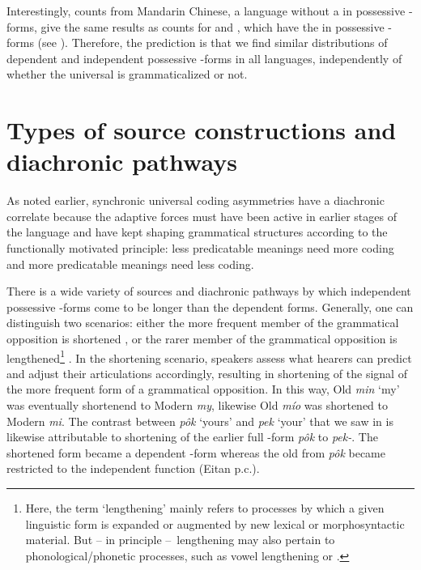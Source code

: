 \documentclass[output=paper]{langsci/langscibook}
\begin{document}
Interestingly,  counts from Mandarin  Chinese, a language without a  in possessive -forms, give the same results as counts for  and , which have the  in possessive -forms (see \citealt{Ye2017}). Therefore, the prediction is that we find similar  distributions of dependent and independent possessive -forms in all languages, independently of whether the universal  is grammaticalized or not.

\section{Types of source constructions and diachronic pathways}\label{sec:michaelis:3}

As noted earlier, synchronic universal coding asymmetries have a diachronic correlate because the adaptive forces must have been active in earlier stages of the language and have kept shaping grammatical structures according to the functionally motivated  principle: less predicatable meanings need more coding and more predicatable meanings need less coding.

There is a wide variety of sources and diachronic pathways by which independent possessive -forms come to be longer than the dependent forms. Generally, one can distinguish two scenarios: either the more frequent member of the grammatical opposition is shortened \citep{Bybee2007}, or the rarer member of the grammatical opposition is lengthened\footnote{Here, the term ‘lengthening’ mainly refers to processes by which a given linguistic form is expanded or augmented by new lexical or morphosyntactic material. But – in principle –~lengthening may also pertain to phonological/phonetic processes, such as vowel lengthening or .} \citep{Haspelmath2008_Econ}. In the shortening scenario, speakers assess what hearers can predict and adjust their articulations accordingly, resulting in shortening of the signal of the more frequent form of a grammatical opposition. In this way, Old  \textit{min} ‘my’ was eventually shortenend to Modern  \textit{my}, likewise Old  \textit{mío} was shortened to Modern  \textit{mi}. The  contrast between \textit{pôk} ‘yours’ and \textit{pek} ‘your’ that we saw in  is likewise attributable to shortening of the earlier full -form \textit{pôk} to \textit{pek-}. The shortened form became a dependent -form whereas the old from \textit{pôk} became restricted to the independent function (Eitan  p.c.).
\end{document}
